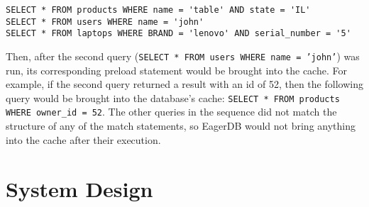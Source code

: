 \documentclass[12pt]{article}
\begin{document}
\begin{lstlisting}
SELECT * FROM products WHERE name = 'table' AND state = 'IL'
SELECT * FROM users WHERE name = 'john'
SELECT * FROM laptops WHERE BRAND = 'lenovo' AND serial_number = '5'
\end{lstlisting}

Then, after the second query (\texttt{SELECT * FROM users WHERE name = 'john'}) was run, its corresponding preload statement would be brought into the cache. For example, if the second query returned a result with an id of 52, then the following query would be brought into the database's cache: \texttt{SELECT * FROM products WHERE owner\_id = 52}. The other queries in the sequence did not match the structure of any of the match statements, so EagerDB would not bring anything into the cache after their execution.

\section{System Design}
\end{document}
